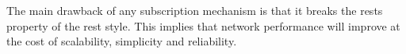 The main drawback of any subscription mechanism is that it breaks the \ac{rests} property of the \ac{rest} style.
This implies that network performance will improve at the cost of scalability, simplicity and reliability. %


% 
% 
